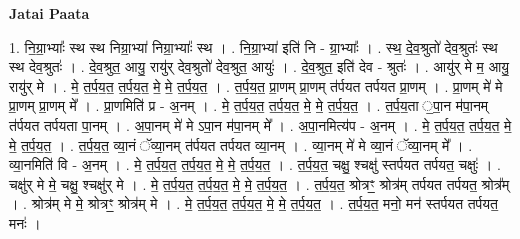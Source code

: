 \documentclass[17pt]{extarticle}
\begin{document}
\textbf{Jatai Paata} \newline

1. नि॒ग्रा॒भ्याः᳚ स्थ स्थ निग्रा॒भ्या॑ निग्रा॒भ्याः᳚ स्थ । . नि॒ग्रा॒भ्या॑ इति॑ नि - ग्रा॒भ्याः᳚ । . स्थ॒ दे॒व॒श्रुतो॑ देव॒श्रुतः॑ स्थ स्थ देव॒श्रुतः॑ । . दे॒व॒श्रुत॒ आयु॒ रायु॑र् देव॒श्रुतो॑ देव॒श्रुत॒ आयुः॑ । . दे॒व॒श्रुत॒ इति॑ देव - श्रुतः॑ । . आयु॑र् मे म॒ आयु॒ रायु॑र् मे । . मे॒ त॒र्प॒य॒त॒ त॒र्प॒य॒त॒ मे॒ मे॒ त॒र्प॒य॒त॒ । . त॒र्प॒य॒त॒ प्रा॒णम् प्रा॒णम् त॑र्पयत तर्पयत प्रा॒णम् । . प्रा॒णम् मे॑ मे प्रा॒णम् प्रा॒णम् मे᳚ । . प्रा॒णमिति॑ प्र - अ॒नम् । . मे॒ त॒र्प॒य॒त॒ त॒र्प॒य॒त॒ मे॒ मे॒ त॒र्प॒य॒त॒ । . त॒र्प॒य॒ता ॒पा॒न म॑पा॒नम् त॑र्पयत तर्पयता पा॒नम् । . अ॒पा॒नम् मे॑ मे ऽपा॒न म॑पा॒नम् मे᳚ । . अ॒पा॒नमित्य॑प - अ॒नम् । . मे॒ त॒र्प॒य॒त॒ त॒र्प॒य॒त॒ मे॒ मे॒ त॒र्प॒य॒त॒ । . त॒र्प॒य॒त॒ व्या॒नं ॅव्या॒नम् त॑र्पयत तर्पयत व्या॒नम् । . व्या॒नम् मे॑ मे व्या॒नं ॅव्या॒नम् मे᳚ । . व्या॒नमिति॑ वि - अ॒नम् । . मे॒ त॒र्प॒य॒त॒ त॒र्प॒य॒त॒ मे॒ मे॒ त॒र्प॒य॒त॒ । . त॒र्प॒य॒त॒ चक्षु॒ श्चक्षु॑ स्तर्पयत तर्पयत॒ चक्षुः॑ । . चक्षु॑र् मे मे॒ चक्षु॒ श्चक्षु॑र् मे । . मे॒ त॒र्प॒य॒त॒ त॒र्प॒य॒त॒ मे॒ मे॒ त॒र्प॒य॒त॒ । . त॒र्प॒य॒त॒ श्रोत्रꣳ॒॒ श्रोत्र॑म् तर्पयत तर्पयत॒ श्रोत्र᳚म् । . श्रोत्र॑म् मे मे॒ श्रोत्रꣳ॒॒ श्रोत्र॑म् मे । . मे॒ त॒र्प॒य॒त॒ त॒र्प॒य॒त॒ मे॒ मे॒ त॒र्प॒य॒त॒ । . त॒र्प॒य॒त॒ मनो॒ मन॑ स्तर्पयत तर्पयत॒ मनः॑ । \newline
\end{document}
